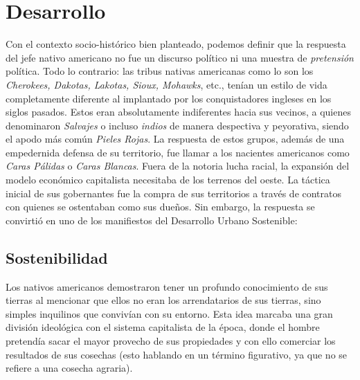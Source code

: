 
\section{Desarrollo}
\label{sec:desarrollo}
Con el contexto socio-histórico bien planteado, podemos definir que la respuesta
del jefe nativo americano no fue un discurso político ni una muestra de \textit{pretensión}
política. Todo lo contrario: las tribus nativas americanas como lo son los
\textit{Cherokees, Dakotas, Lakotas, Sioux, Mohawks}, etc., tenían un estilo de vida
completamente diferente al implantado por los conquistadores ingleses en los siglos
pasados. Estos eran absolutamente indiferentes hacia sus vecinos, a quienes denominaron
\textit{Salvajes} o incluso \textit{indios} de manera despectiva y peyorativa, siendo
el apodo más común \textit{Pieles Rojas}. La respuesta de estos grupos, además de una
empedernida defensa de su territorio, fue llamar a los nacientes americanos como
\textit{Caras Pálidas} o \textit{Caras Blancas}. Fuera de la notoria lucha racial, la expansión
del modelo económico capitalista necesitaba de los terrenos del oeste. La táctica inicial de
sus gobernantes fue la compra de sus territorios a través de contratos con quienes se ostentaban
como sus dueños. Sin embargo, la respuesta se convirtió en uno de los manifiestos
del Desarrollo Urbano Sostenible:
\subsection{Sostenibilidad}
\label{ssec:sostenibilidad}
Los nativos americanos demostraron tener un profundo conocimiento de sus tierras al mencionar
que ellos no eran los arrendatarios de sus tierras, sino simples inquilinos que convivían con su
entorno. Esta idea marcaba una gran división ideológica con el sistema capitalista de la época,
donde el hombre pretendía sacar el mayor provecho de sus propiedades y con ello comerciar los
resultados de sus cosechas (esto hablando en un término figurativo, ya que no se refiere a una cosecha
agraria).

